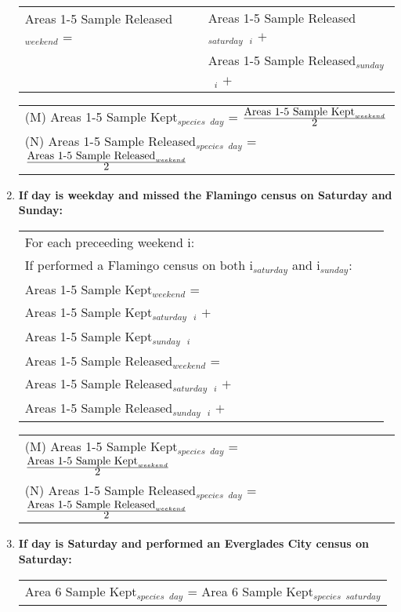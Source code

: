 \documentclass[letterpaper,12pt]{article}
\newcommand{\hspacer}{\hspace*{1cm}}
\newcommand{\fraction}[1]{\textrm{\normalsize{#1}}}
\begin{document}
\begin{enumerate}
\begin{tabular}{l@{ }l@{ }}
	Areas 1-5 Sample Released$_{weekend}$ =
	& Areas 1-5 Sample Released$_{saturday}$\ $_{i}$ $+$ \\
	& Areas 1-5 Sample Released$_{sunday}$\ $_{i}$ $+$
\end{tabular}

\begin{tabular}{l@{ }}
	(M) Areas 1-5 Sample Kept$_{species}$ $_{day}$ =
		$
\frac
	{\fraction{Areas 1-5 Sample Kept}_{weekend}}
      	{\fraction{2}}
		$ \\

	(N) Areas 1-5 Sample Released$_{species}$ $_{day}$ =
		$
\frac
	{\fraction{Areas 1-5 Sample Released}_{weekend}}
      	{\fraction{2}}
		$
\end{tabular}

\item
\textbf{If day is weekday and missed the Flamingo census on Saturday and Sunday:} \\
\begin{tabular}{l@{ }l@{ }l}
	For each preceeding weekend i: \\
\hspacer If performed a Flamingo census on both i$_{saturday}$ and i$_{sunday}$: \\
\hspacer \hspacer	Areas 1-5 Sample Kept$_{weekend}$ = \\
\hspacer \hspacer \hspacer Areas 1-5 Sample Kept$_{saturday}$\ $_{i}$ $+$ \\
\hspacer \hspacer \hspacer Areas 1-5 Sample Kept$_{sunday}$\ $_{i}$ \\

\hspacer \hspacer	Areas 1-5 Sample Released$_{weekend}$ = \\
\hspacer \hspacer \hspacer Areas 1-5 Sample Released$_{saturday}$\ $_{i}$ $+$ \\
\hspacer \hspacer \hspacer Areas 1-5 Sample Released$_{sunday}$\ $_{i}$ $+$
\end{tabular}

\begin{tabular}{l@{ }l@{ }l}
	(M) Areas 1-5 Sample Kept$_{species}$ $_{day}$ =
		$
\frac
	{\fraction{Areas 1-5 Sample Kept}_{weekend}}
      	{\fraction{2}}
		$ \\

	(N) Areas 1-5 Sample Released$_{species}$ $_{day}$ =
		$
\frac
	{\fraction{Areas 1-5 Sample Released}_{weekend}}
      	{\fraction{2}}
		$
\end{tabular}

\item
\textbf{If day is Saturday and performed an Everglades City census on Saturday:} \\
\begin{tabular}{l@{ }}
	Area 6 Sample Kept$_{species}$ $_{day}$ =
		Area 6 Sample Kept$_{species}$ $_{saturday}$
\end{tabular}


\end{enumerate}
\end{document}
